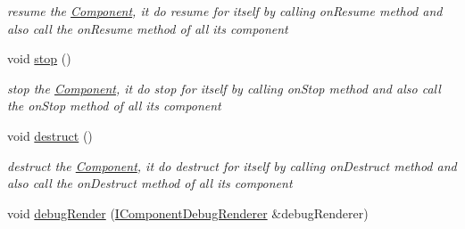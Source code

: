 \begin{DoxyCompactItemize}
\begin{DoxyCompactList}\small\item\em resume the \hyperlink{class_magnum_1_1_component}{Component}, it do resume for itself by calling on\+Resume method and also call the on\+Resume method of all its component \end{DoxyCompactList}\item 
void \hyperlink{class_magnum_1_1_component_1_1_owner_a15f03464f950e9dd594e9f044827e38f}{stop} ()\hypertarget{class_magnum_1_1_component_1_1_owner_a15f03464f950e9dd594e9f044827e38f}{}\label{class_magnum_1_1_component_1_1_owner_a15f03464f950e9dd594e9f044827e38f}

\begin{DoxyCompactList}\small\item\em stop the \hyperlink{class_magnum_1_1_component}{Component}, it do stop for itself by calling on\+Stop method and also call the on\+Stop method of all its component \end{DoxyCompactList}\item 
void \hyperlink{class_magnum_1_1_component_1_1_owner_af9a6ef2721ea21d86aece54ab1bae0c0}{destruct} ()\hypertarget{class_magnum_1_1_component_1_1_owner_af9a6ef2721ea21d86aece54ab1bae0c0}{}\label{class_magnum_1_1_component_1_1_owner_af9a6ef2721ea21d86aece54ab1bae0c0}

\begin{DoxyCompactList}\small\item\em destruct the \hyperlink{class_magnum_1_1_component}{Component}, it do destruct for itself by calling on\+Destruct method and also call the on\+Destruct method of all its component \end{DoxyCompactList}\item 
void \hyperlink{class_magnum_1_1_component_1_1_owner_a4bcd81179c5e4ce113f88c6925149ef4}{debug\+Render} (\hyperlink{class_magnum_1_1_i_component_debug_renderer}{I\+Component\+Debug\+Renderer} \&debug\+Renderer)\hypertarget{class_magnum_1_1_component_1_1_owner_a4bcd81179c5e4ce113f88c6925149ef4}{}\label{class_magnum_1_1_component_1_1_owner_a4bcd81179c5e4ce113f88c6925149ef4}


\end{DoxyCompactItemize}
